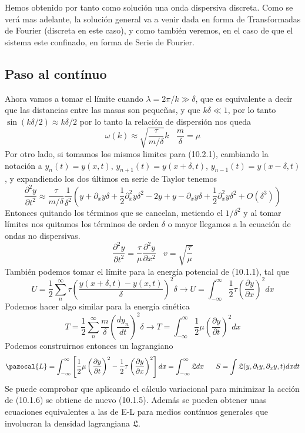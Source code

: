 Hemos obtenido por tanto como solución una onda dispersiva discreta. Como se verá mas adelante, la solución general va a venir dada en forma de Transformadas de Fourier (discreta en este caso), y como también veremos, en el caso de que el sistema este confinado, en forma de Serie de Fourier.

\newpage
\subsection{Paso al contínuo}
Ahora vamos a tomar el límite cuando $\lambda = 2\pi / k \gg \delta$, que es equivalente a decir que las distancias entre las masas son pequeñas, y que $k\delta \ll 1$, por lo tanto $\sin{\left(k \delta/2\right)} \approx k \delta/2$ por lo tanto la relación de dispersión nos queda 
\begin{equation} \label{6.1.1}
    \omega (k) \approx  \sqrt{\frac{\tau}{m/\delta}} k \ \ \ \ \frac{m}{\delta} = \mu
\end{equation}
Por otro lado, si tomamos los mismos limites para (10.2.1), cambiando la notación a $y_{n} (t) = y(x,t)$, $y_{n+1}(t) = y(x+\delta,t)$, $y_{n-1}(t) = y(x-\delta,t)$, y expandiendo los dos últimos en serie de Taylor tenemos
\[\frac{\partial^2 y}{\partial t^2} \approx \frac{\tau}{m/\delta} \frac{1}{\delta^2}\left(y+\partial_x y\delta + \frac{1}{2}\partial^2_xy \delta^2-2y+y-\partial_x y \delta + \frac{1}{2}\partial^2_x y \delta^2+ O(\delta^3)\right)\]
Entonces quitando los términos que se cancelan, metiendo el $1/\delta^2$ y al tomar límites nos quitamos los términos de orden $\delta$ o mayor llegamos a la ecuación de ondas no dispersivas.
\begin{equation} \label{6.1.1}
    \frac{\partial^2 y}{\partial t^2} = \frac{\tau}{\mu} \frac{\partial^2 y}{\partial x^2} \ \ \ \ v = \sqrt{\frac{\tau}{\mu}}
\end{equation}
También podemos tomar el límite para la energía potencial de (10.1.1), tal que
\[ U = \frac{1}{2} \sum_n^\infty \tau \left(\frac{y(x+\delta,t)-y(x,t)}{\delta}\right)^2 \delta \rightarrow U = \int_{-\infty}^\infty \frac{1}{2} \tau \left(\frac{\partial y}{\partial x}\right)^2 dx\]
Podemos hacer algo similar para la energía cinética
\[ T = \frac{1}{2} \sum_n^\infty \frac{m}{\delta} \left(\frac{d y_n}{dt}\right)^2 \delta \rightarrow T = \int_{-\infty}^\infty \frac{1}{2} \mu \left(\frac{\partial y}{\partial t}\right)^2 dx\]
Podemos construirnos entonces un lagrangiano
\begin{equation} \label{6.1.1}
    \pazocal{L} = \int_{-\infty}^\infty \left[\frac{1}{2} \mu \left(\frac{\partial y}{\partial t}\right)^2 -\frac{1}{2} \tau \left(\frac{\partial y}{\partial x}\right)^2\right] dx= \int_{-\infty}^\infty \mathfrak{L}dx \ \ \ \ \ S = \int \mathfrak{L}(y,\partial_t y,\partial_x y,t) dxdt
\end{equation}
Se puede comprobar que aplicando el cálculo variacional para minimizar la acción de (10.1.6) se obtiene de nuevo (10.1.5). Además se pueden obtener unas ecuaciones equivalentes a las de E-L para medios contínuos generales que involucran la densidad lagrangiana $\mathfrak{L}$.

